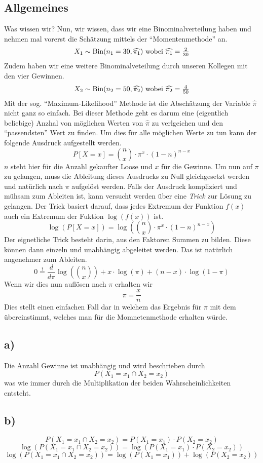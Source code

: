 \subsection*{Allgemeines}
Was wissen wir? Nun, wir wissen, dass wir eine Binominalverteilung haben
und nehmen mal vorerst die Schätzung mittels der ``Momentenmethode'' an. 
\[X_1 \sim \text{Bin}(n_1=30, \widehat{\pi_1})$ 
  wobei $\widehat{\pi_1} = \frac{2}{30}\]
Zudem haben wir eine weitere Binominalveteilung durch unseren Kollegen mit
den vier Gewinnen.
\[X_2 \sim \text{Bin}(n_2=50, \widehat{\pi_2})$ 
  wobei $\widehat{\pi_2} = \frac{4}{50}\]
Mit der sog. ``Maximum-Likelihood'' Methode ist die Abschätzung der
Variable $\widehat{\pi}$ nicht ganz so einfach. Bei dieser Methode geht
es darum eine (eigentlich beliebige) Anzhal von möglichen Werten von 
$\widehat{\pi}$ zu verlgeichen und den ``passendsten'' Wert zu finden.
Um dies für alle möglichen Werte zu tun kann der folgende Ausdruck aufgestellt
werden.
\[  P[X=x] = {n \choose x} \cdot \pi^x \cdot (1-n)^{n-x} \]
$n$ steht hier für die Anzahl gekaufter Loose und $x$ für die Gewinne.
Um nun auf $\pi$ zu gelangen, muss die Ableitung dieses Ausdrucks zu Null
gleichgesetzt werden und natürlich nach $\pi$ aufgelöst werden.
Falls der Ausdruck kompliziert und mühsam zum Ableiten ist, kann versucht 
werden über eine \emph{Trick} zur Lösung zu gelangen. Der Trick basiert
darauf, dass jedes Extremum der Funktion $f(x)$ auch ein Extremum der 
Fuktion $\log(f(x))$ ist.
\[ \log\left(P[X=x]\right) = 
   \log\left({n \choose x} \cdot \pi^x \cdot (1-n)^{n-x}\right) \]
Der eignetliche Trick besteht darin, aus den Faktoren Summen zu bilden.
Diese können dann einzeln und unabhängig abgeleitet werden. Das ist natürlich
angenehmer zum Ableiten.
\[ 0 \stackrel{!}{=} \frac{d}{d\pi} \log\left( {n \choose x} \right) +
   x \cdot \log( \pi ) + (n-x)\cdot \log(1-\pi) \]
Wenn wir dies nun auflösen nach $\pi$ erhalten wir
\[ \pi = \frac{x}{n} \]
Dies stellt einen einfachen Fall dar in welchem das Ergebnis für $\pi$
mit dem übereinstimmt, welches man für die Momnetenmethode erhalten würde.

\subsection*{a)}
Die Anzahl Gewinne ist unabhängig und wird beschrieben durch
\[ P(X_1 = x_1 \cap X_2 = x_2 ) \]
was wie immer durch die Multiplikation der beiden Wahrscheinlichkeiten
entsteht.

\subsection*{b)}
\[ P(X_1 = x_1 \cap X_2 = x_2 ) =  P(X_1 = x_1) \cdot P(X_2=x_2)\]
\[ \log(P(X_1=x_1 \cap X_2=x_2)) = \log( P(X_1 = x_1) \cdot P(X_2=x_2)) \]
\[ \log(P(X_1=x_1 \cap X_2=x_2)) = \log( P(X_1 = x_1)) + \log(P(X_2=x_2)) \]

